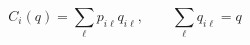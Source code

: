 \par\needspace{70pt}\begin{minipage}{\linewidth}
\begin{equation}C_i(q)=\sum_{\ell}p_{i\ell}q_{i\ell},\qquad\sum_{\ell}q_{i\ell}=q\label{eq:6}\end{equation}
\end{minipage}\par

